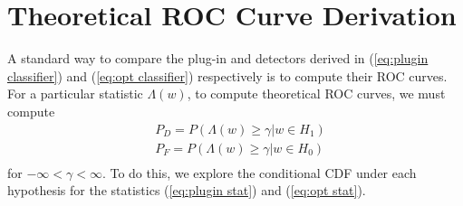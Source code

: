 \section{Theoretical ROC Curve Derivation}\label{sec:roc}
A standard way to compare the plug-in and \DIFdelbegin {}\DIFdelend \DIFaddbegin {}\DIFaddend detectors derived in (\ref{eq:plugin classifier}) and (\ref{eq:opt classifier}) respectively is to compute their ROC curves. For a particular statistic $\Lambda(w)$, to compute theoretical ROC curves, we must compute
\begin{equation}\label{eq:target cdf}
\begin{aligned}
&P_D = P(\Lambda(w) \geq \gamma| w\in H_1)\\
&P_F = P(\Lambda(w) \geq \gamma| w\in H_0)\\
\end{aligned}
\end{equation}
for $-\infty<\gamma<\infty$. To do this, we explore the conditional CDF under each hypothesis for the statistics (\ref{eq:plugin stat}) and (\ref{eq:opt stat}).

